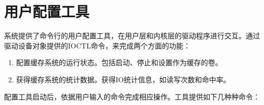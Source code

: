 
\section{用户配置工具}
\label{sec:config_utility}

系统提供了命令行的用户配置工具，在用户层和内核层的驱动程序进行交互。通过驱动设备对象提供的IOCTL命令，来完成两个方面的功能：
\begin{enumerate}
\item 配置缓存系统的运行状态。包括启动、停止和设置作为缓存的卷。
\item 获得缓存系统的统计数据。获得IO统计信息，如读写次数和命中率。
\end{enumerate}

配置工具启动后，依据用户输入的命令完成相应操作。工具提供如下几种种命令：

